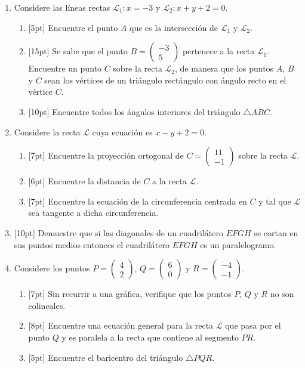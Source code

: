 \documentclass[11pt]{article}
\newcommand{\vect}[2]{\begin{pmatrix}#1\\#2\end{pmatrix}}
\begin{document}
\begin{enumerate}
\item Considere las líneas rectas $\mathcal{L}_1: x=-3$ y $\mathcal{L}_2: x+y+2=0$.

\begin{enumerate}[label=(\alph*)]
\item{}[5pt] Encuentre el punto $A$ que es la intersección de $\mathcal{L}_1$ y $\mathcal{L}_2$.
\item{}[15pt] Se sabe que el punto $B=\vect{-3}{5}$ pertenece a la recta $\mathcal{L}_1$. Encuentre un punto $C$ sobre la recta $\mathcal{L}_2$, de manera que los puntos $A$, $B$ y $C$ sean los vértices de un triángulo rectángulo con ángulo recto en el vértice $C$.
\item{}[10pt] Encuentre todos los ángulos interiores del triángulo $\triangle ABC$.
\end{enumerate}

\item Considere la recta $\mathcal{L}$ cuya ecuación es $x-y+2=0$.

\begin{enumerate}[label=(\alph*)]
\item{}[7pt] Encuentre la proyección ortogonal de $C=\vect{11}{-1}$ sobre la recta $\mathcal{L}$.
\item{}[6pt] Encuentre la distancia de $C$ a la recta $\mathcal{L}$.
\item{}[7pt] Encuentre la ecuación de la circunferencia centrada en $C$ y tal que $\mathcal{L}$ sea tangente a dicha circunferencia.
\end{enumerate}

\item{}[10pt] Demuestre que si las diagonales de un cuadrilátero $EFGH$ se cortan en sus puntos medios entonces el cuadrilátero $EFGH$ es un paralelogramo.

\item Considere los puntos $P=\vect{4}{2}$, $Q=\vect{6}{0}$ y $R=\vect{-4}{-1}$.

\begin{enumerate}[label=(\alph*)]
\item{}[7pt] Sin recurrir a una gráfica, verifique que los puntos $P$, $Q$ y $R$ no son colineales.
\item{}[8pt] Encuentre una ecuación general para la recta $\mathcal{L}$ que pasa por el punto $Q$ y es paralela a la recta que contiene al segmento $\overline{PR}$.
\item{}[5pt] Encuentre el baricentro del triángulo $\triangle PQR$.
\end{enumerate}
\end{enumerate}
\end{document}
